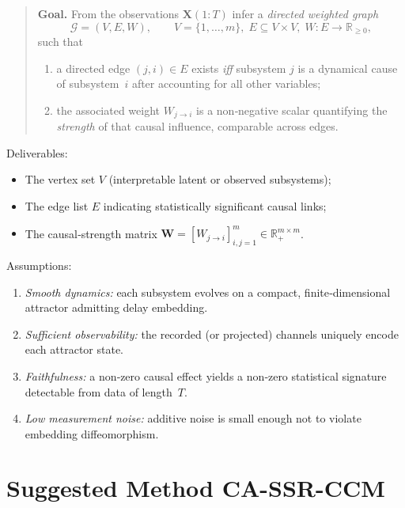 \documentclass[14pt]{extarticle}
\begin{document}
	\begin{quote}
		\textbf{Goal.}  
		From the observations $\mathbf X(1{:}T)$ infer a \emph{directed weighted
			graph}
		\[
		\mathcal G=(V,E,W), \qquad
		V=\{1,\dots ,m\},\;
		E\subseteq V\times V,\;
		W:E\to\mathbb R_{\ge 0},
		\]
		such that
		\begin{enumerate}[label=(\roman*)]
			\item a directed edge $(j,i)\in E$ exists
			\emph{iff} subsystem $j$ is a dynamical cause of subsystem $i$
			after accounting for all other variables;
			\item the associated weight $W_{j\to i}$ is a non‑negative scalar
			quantifying the \emph{strength} of that causal influence,
			comparable across edges.
		\end{enumerate}
	\end{quote}
	
	Deliverables:
	\begin{itemize}
		\item The vertex set $V$ (interpretable latent or observed subsystems);
		\item The edge list $E$ indicating statistically significant
		causal links;
		\item The causal‑strength matrix
		$\mathbf W=[W_{j\to i}]_{i,j=1}^{m}\in\mathbb R_+^{m\times m}$.
	\end{itemize}
	
	Assumptions:
	\begin{enumerate}[label=\arabic*.]
		\item \textit{Smooth dynamics:} each subsystem evolves on a compact,
		finite‑dimensional attractor admitting delay embedding.
		\item \textit{Sufficient observability:} the recorded (or projected)
		channels uniquely encode each attractor state.
		\item \textit{Faithfulness:} a non‑zero causal effect yields a
		non‑zero statistical signature detectable from data of length $T$.
		\item \textit{Low measurement noise:} additive noise is small enough not
		to violate embedding diffeomorphism.
	\end{enumerate}
	
	\section{Suggested Method CA-SSR-CCM}
	
\end{document}
